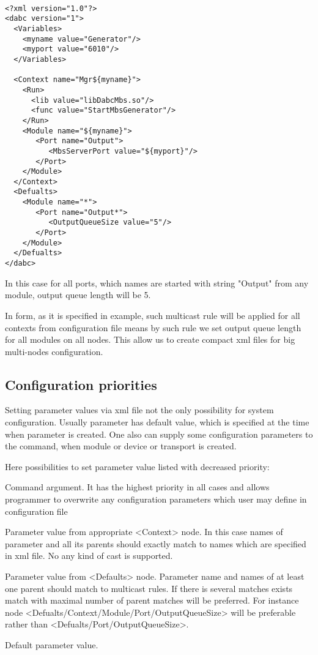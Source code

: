 \begin{verbatim}

<?xml version="1.0"?>
<dabc version="1">
  <Variables>
    <myname value="Generator"/> 
    <myport value="6010"/> 
  </Variables>

  <Context name="Mgr${myname}">
    <Run>
      <lib value="libDabcMbs.so"/>
      <func value="StartMbsGenerator"/>
    </Run>
    <Module name="${myname}">
       <Port name="Output">
          <MbsServerPort value="${myport}"/>
       </Port>
    </Module>
  </Context>
  <Defualts>
    <Module name="*">
       <Port name="Output*">
          <OutputQueueSize value="5"/>
       </Port>
    </Module>
  </Defualts>
</dabc>

\end{verbatim}

In this case for all ports, which names are started with string "Output" from any module,
output queue length will be 5. 

In form, as it is specified in example, such multicast rule will be applied for 
all contexts from configuration file means by such rule we set output queue length 
for all modules on all nodes. This allow us to create compact xml files for big multi-nodes configuration.   


\subsection{Configuration priorities}

Setting parameter values via xml file not the only possibility for system configuration. 
Usually parameter has default value, which is specified at the time when parameter is created.
One also can supply some configuration parameters to the command, when module or device or transport is created.

Here possibilities to set parameter value listed with decreased priority:

\bbul
\item Command argument. It has the highest priority in all cases and allows programmer to
overwrite any configuration parameters which user may define in configuration file
\item Parameter value from appropriate <Context> node. In this case names of parameter and all its parents  
should exactly match to names which are specified in xml file. No any kind of cast is supported.  
\item Parameter value from <Defaults> node. Parameter name and names of at least one parent should match to multicast rules.
If there is several matches exists match with maximal number of parent matches will be preferred.
For instance node <Defualts/Context/Module/Port/OutputQueueSize> will be preferable rather than
<Defualts/Port/OutputQueueSize>. 
\item Default parameter value.
\ebul
    

